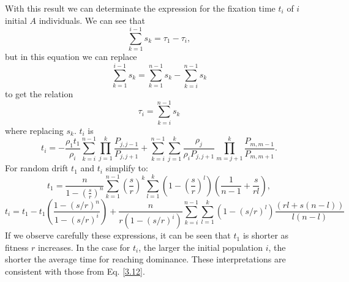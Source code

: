 With this result we can determinate the expression for the fixation time $t_{i}$ of $i$ initial $A$ individuals. We can see that 
\begin{equation}
\sum\limits_{k=1}^{i-1}s_k=\tau_1 -\tau_i,
\end{equation}   
but in this equation we can replace
\begin{equation*}
\sum\limits_{k=1}^{i-1}s_k=\sum\limits_{k=1}^{n-1}s_k -\sum\limits_{k=i}^{n-1}s_k
\end{equation*} 
to get the relation
\begin{equation}
\tau_i=\sum\limits_{k=i}^{n-1}s_k
\end{equation}
where replacing $s_k$.  $t_i$ is
\begin{equation}\label{4.39}
t_i=-\frac{\rho_1 t_1}{\rho_i}\sum\limits_{k=i}^{n-1}\prod\limits_{j=1}^{k}\frac{P_{j,j-1}}{P_{j,j+1}} + \sum\limits_{k=i}^{n-1}\sum\limits_{j=1}^{k}\frac{\rho_j}{\rho_i P_{j,j+1}}\prod\limits_{m=j+1}^{k}\frac{P_{m,m-1}}{P_{m,m+1}}.
\end{equation}
For random drift $t_1$ and $t_i$ simplify to:
\begin{equation}
t_{1}=\frac{n}{1-(\frac{s}{r})^n}\sum\limits_{k=1}^{n-1}(\frac{s}{r})^k \sum\limits_{l=1}^{k}\left(1-(\frac{s}{r})^l \right)\left(\frac{1}{n-1}+\frac{s}{rl}\right),
\end{equation}
\begin{equation}
t_i=t_1 -t_1\left(\frac{1-(s/r)^n}{1-(s/r)^i}\right)+\frac{n}{r(1-(s/r)^i)}\sum\limits_{k=i}^{n-1}\sum\limits_{l=1}^{k}\left(1-(s/r)^l\right)\frac{(rl+s(n-l))}{l(n-l)}
\end{equation}
If we observe carefully these expressions, it can be seen that $t_1$ is shorter as fitness $r$ increases. In the case for $t_{i}$, the larger the initial population $i$, the shorter the average time for reaching dominance. These interpretations are consistent  with those from Eq. \eqref{3.12}. 


